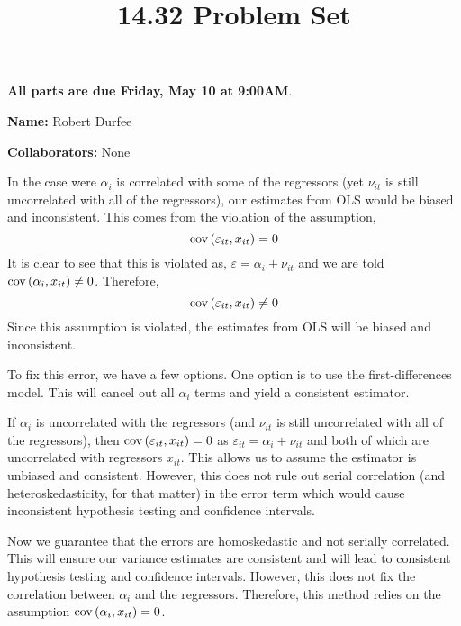 \documentclass[12pt,twoside]{article}
\title{14.32 Problem Set \theproblemsetnum}
\newcommand{\theproblemsetnum}{6}
\newcommand{\releasedate}{Wednesday, May 1}
\newcommand{\partaduedate}{Friday, May 10}
\begin{document}
\handout{Problem Set \theproblemsetnum}{\releasedate}
\textbf{All parts are due {\bf \partaduedate} at {\bf 9:00AM}}.

\setlength{\parindent}{0pt}
\medskip\hrulefill\medskip

{\bf Name:} Robert Durfee

\medskip

{\bf Collaborators:} None

\medskip\hrulefill

\begin{problems}

\problem  %

\begin{problemparts}

\problempart  %

In the case were $\alpha_i$ is correlated with some of the regressors (yet
$\nu_{it}$ is still uncorrelated with all of the regressors), our estimates
from OLS would be biased and inconsistent. This comes from the violation of
the assumption,
$$ \operatorname{cov}\left(\varepsilon_{it}, x_{it}\right) = 0 $$
It is clear to see that this is violated as, $\varepsilon = \alpha_i +
\nu_{it}$ and we are told $\operatorname{cov}\left(\alpha_i, x_{it}\right) \neq 0$.
Therefore,
$$ \operatorname{cov}\left(\varepsilon_{it}, x_{it}\right) \neq 0 $$
Since this assumption is violated, the estimates from OLS will be
biased and inconsistent.

To fix this error, we have a few options. One option is to use the
first-differences model. This will cancel out all $\alpha_i$ terms and yield
a consistent estimator.

\problempart  %

If $\alpha_i$ is uncorrelated with the regressors (and $\nu_{it}$ is still
uncorrelated with all of the regressors), then $\operatorname{cov}\left(\varepsilon_{it},
x_{it}\right) = 0$ as $\varepsilon_{it} = \alpha_i + \nu_{it}$ and both of
which are uncorrelated with regressors $x_{it}$. This allows us to assume the
estimator is unbiased and consistent. However, this does not rule out serial
correlation (and heteroskedasticity, for that matter) in the error term which
would cause inconsistent hypothesis testing and confidence intervals.

\problempart  %

\problempart  %

Now we guarantee that the errors are homoskedastic and not serially
correlated. This will ensure our variance estimates are consistent and will
lead to consistent hypothesis testing and confidence intervals. However, this
does not fix the correlation between $\alpha_i$ and the regressors.
Therefore, this method relies on the assumption $\operatorname{cov}\left(\alpha_i,
x_{it}\right) = 0$.


\end{problemparts}
\end{problems}
\end{document}
